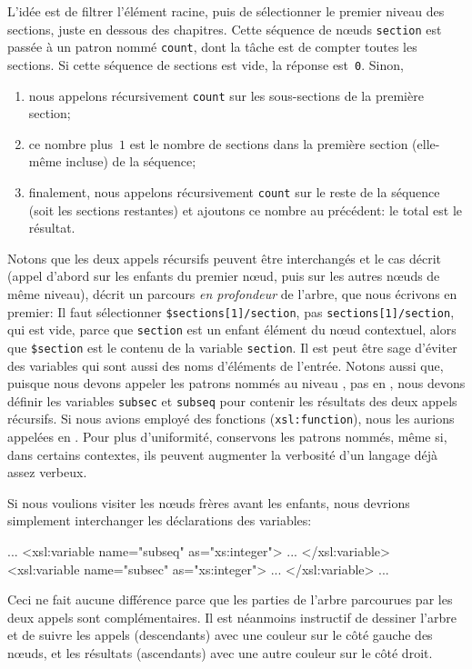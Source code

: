 L'idée est de filtrer l'élément racine, puis de sélectionner le
premier niveau des sections, juste en dessous des chapitres. Cette
séquence de nœuds \texttt{section} est passée à un patron nommé
\texttt{count}, dont la tâche est de compter toutes les sections. Si
cette séquence de sections est vide, la réponse est~\texttt{0}. Sinon,
\begin{enumerate}

\item nous appelons récursivement \texttt{count} sur les sous-sections
  de la première section;

\item ce nombre plus~\(1\) est le nombre de sections dans la première
  section (elle-même incluse) de la séquence;

\item finalement, nous appelons récursivement \texttt{count} sur le
  reste de la séquence (soit les sections restantes) et ajoutons ce
  nombre au précédent: le total est le résultat.

\end{enumerate}
Notons que les deux appels récursifs peuvent être interchangés et le
cas décrit (appel d'abord sur les enfants du premier nœud, puis
sur les autres nœuds de même niveau), décrit un parcours \emph{en
  profondeur} de l'arbre, que nous écrivons en premier:
\noindent Il faut sélectionner \texttt{\$sections[1]/section}, pas
\texttt{sections[1]/section}, qui est vide, parce que \texttt{section}
est un enfant élément du nœud contextuel, alors que
\texttt{\$section} est le contenu de la variable \texttt{section}. Il
est peut être sage d'éviter des variables qui sont aussi des noms
d'éléments de l'entrée. Notons aussi que, puisque nous devons appeler
les patrons nommés au niveau \XSLT, pas en \XPath, nous devons définir
les variables \texttt{subsec} et \texttt{subseq} pour contenir les
résultats des deux appels récursifs. Si nous avions employé des
fonctions \XSLT (\texttt{xsl:function}), nous les aurions appelées en
\XPath. Pour plus d'uniformité, conservons les patrons nommés, même
si, dans certains contextes, ils peuvent augmenter la verbosité d'un
langage déjà assez verbeux.

Si nous voulions visiter les nœuds frères avant les enfants, nous
devrions simplement interchanger les déclarations des variables:
\begin{sverb}
      ...
        <xsl:variable name="subseq" as="xs:integer">
          ...
        </xsl:variable>
        <xsl:variable name="subsec" as="xs:integer">
          ...
        </xsl:variable>
        ...
\end{sverb}
Ceci ne fait aucune différence parce que les parties de l'arbre
parcourues par les deux appels sont complémentaires. Il est néanmoins
instructif de dessiner l'arbre \XML et de suivre les appels
(descendants) avec une couleur sur le côté gauche des nœuds, et
les résultats (ascendants) avec une autre couleur sur le côté droit.

